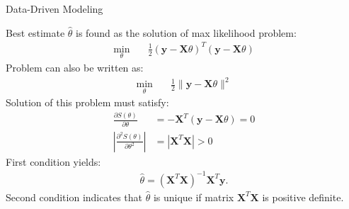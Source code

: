\documentclass[handout,9pt]{beamer}
\begin{document}
%
\begin{frame}{Data-Driven Modeling}

Best estimate $\hat{\theta}$ is found as the solution of max likelihood problem:
\begin{align*}
\min_{\theta}&\quad \frac{1}{2}(\mathbf{y}-\mathbf{X}\theta)^T (\mathbf{y}-\mathbf{X}\theta)
\end{align*}
Problem can also be written as:
\begin{align*}
\min_{\theta}&\quad \frac{1}{2}\|\mathbf{y}-\mathbf{X}\theta\|^2
\end{align*}
Solution of this problem must satisfy:
\begin{align*}
\frac{\partial S(\theta)}{\partial \theta} &= -\mathbf{X}^T(\mathbf{y}-\mathbf{X}\theta)=0\\
\left|\frac{\partial^2 S(\theta)}{\partial \theta^2}\right| &= \left|\mathbf{X}^T\mathbf{X}\right|>0
\end{align*}
First condition yields:
\begin{align*}
\hat{\theta}=(\mathbf{X}^T\mathbf{X})^{-1}\mathbf{X}^T\mathbf{y}.
\end{align*}
Second condition indicates that $\hat{\theta}$ is unique if matrix $\mathbf{X}^T\mathbf{X}$ is positive definite. 

\end{frame}
\end{document}
